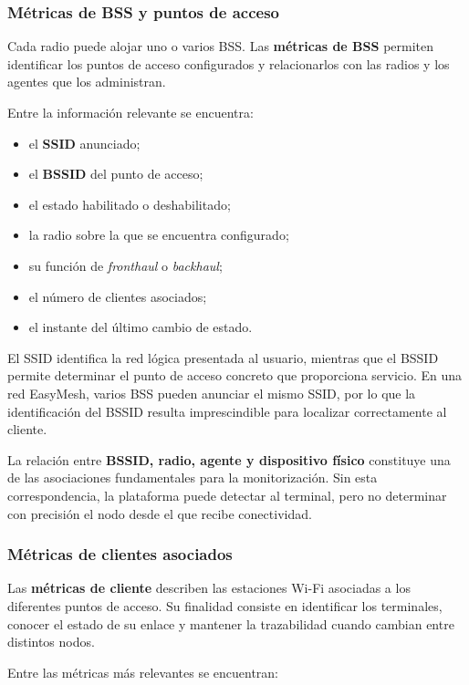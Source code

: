 \subsubsection*{Métricas de BSS y puntos de acceso}

Cada radio puede alojar uno o varios BSS. Las
\textbf{métricas de BSS} permiten identificar los puntos de acceso
configurados y relacionarlos con las radios y los agentes que los
administran.

Entre la información relevante se encuentra:

\begin{itemize}
    \item el \textbf{SSID} anunciado;
    \item el \textbf{BSSID} del punto de acceso;
    \item el estado habilitado o deshabilitado;
    \item la radio sobre la que se encuentra configurado;
    \item su función de \textit{fronthaul} o
    \textit{backhaul};
    \item el número de clientes asociados;
    \item el instante del último cambio de estado.
\end{itemize}

El SSID identifica la red lógica presentada al usuario, mientras que el
BSSID permite determinar el punto de acceso concreto que proporciona
servicio. En una red EasyMesh, varios BSS pueden anunciar el mismo SSID,
por lo que la identificación del BSSID resulta imprescindible para
localizar correctamente al cliente.

La relación entre \textbf{BSSID, radio, agente y dispositivo físico}
constituye una de las asociaciones fundamentales para la monitorización.
Sin esta correspondencia, la plataforma puede detectar al terminal, pero
no determinar con precisión el nodo desde el que recibe conectividad.

\subsubsection*{Métricas de clientes asociados}

Las \textbf{métricas de cliente} describen las estaciones Wi-Fi
asociadas a los diferentes puntos de acceso. Su finalidad consiste en
identificar los terminales, conocer el estado de su enlace y mantener la
trazabilidad cuando cambian entre distintos nodos.

Entre las métricas más relevantes se encuentran:


